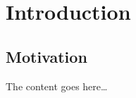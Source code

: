 \documentclass[a4paper,11pt,pdftex,halfparskip,cleardoubleempty]{scrbook}
\begin{document}

\cleardoublepage
\tableofcontents 
\cleardoublepage
{}
\pagestyle{plain} 

\chapter{Introduction}
\label{chp:introduction}

\section{Motivation}
\label{sec:introduction}

The content goes here\ldots
\end{document}
